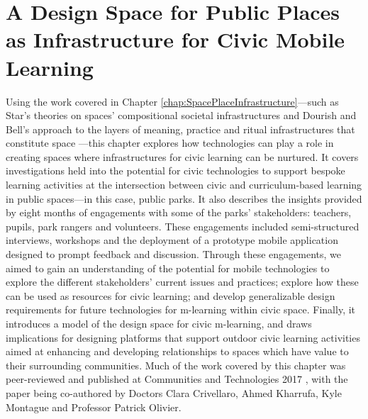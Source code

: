 \chapter{A Design Space for Public Places as Infrastructure for Civic Mobile Learning}
\label{chap:DesignSpace}

Using the work covered in Chapter \ref{chap:SpacePlaceInfrastructure}---such as Star’s theories on spaces’ compositional societal infrastructures \citep{Star1999} and Dourish and Bell’s approach to the layers of meaning, practice and ritual infrastructures that constitute space \citep{Dourish2006}---this chapter explores how technologies can play a role in creating spaces where infrastructures for civic learning can be nurtured. It covers investigations held into the potential for civic technologies to support bespoke learning activities at the intersection between civic and curriculum-based learning in public spaces---in this case, public parks. It also describes the insights provided by eight months of engagements with some of the parks' stakeholders: teachers, pupils, park rangers and volunteers. These engagements included semi-structured interviews, workshops and the deployment of a prototype mobile application designed to prompt feedback and discussion. Through these engagements, we aimed to gain an understanding of the potential for mobile technologies to explore the different stakeholders' current issues and practices; explore how these can be used as resources for civic learning; and develop generalizable design requirements for future technologies for m-learning within civic space. Finally, it introduces a model of the design space for civic m-learning, and draws implications for designing platforms that support outdoor civic learning activities aimed at enhancing and developing relationships to spaces which have value to their surrounding communities. Much of the work covered by this chapter was peer-reviewed and published at Communities and Technologies 2017 \citep{Richardson2017}, with the paper being co-authored by Doctors Clara Crivellaro, Ahmed Kharrufa, Kyle Montague and Professor Patrick Olivier. 

